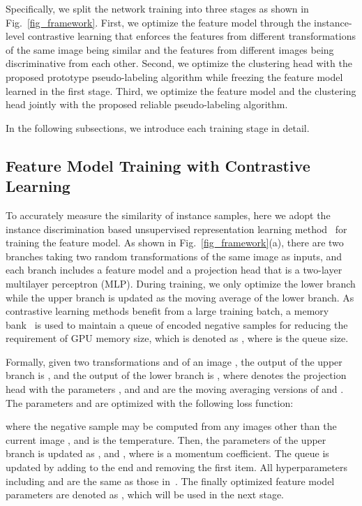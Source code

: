 \documentclass[journal]{IEEEtran}
\begin{document}
Specifically, we split the network training into three stages as shown in Fig.~\ref{fig_framework}.
First, we optimize the feature model  through the instance-level contrastive learning that enforces the features from different transformations of the same image being similar and the features from different images being discriminative from each other. 
Second, we optimize the clustering head  with the proposed prototype pseudo-labeling algorithm while freezing the feature model learned in the first stage.
Third, we optimize the feature model and the clustering head jointly with the proposed reliable pseudo-labeling algorithm.


In the following subsections, we introduce each training stage in detail.



\subsection{Feature Model Training with Contrastive Learning}\label{sec_fea}
To accurately measure the similarity of instance samples, here we adopt the instance discrimination based unsupervised representation learning method~\cite{He_2020_CVPR} for training the feature model.
As shown in Fig.~\ref{fig_framework}(a), there are two branches taking two random transformations of the same image as inputs, and each branch includes a feature model and a projection head that is a two-layer multilayer perceptron (MLP).
During training, we only optimize  the lower branch while the upper branch is updated as the moving average of the lower branch.
As contrastive learning methods benefit from a large training batch, a memory bank~\cite{wu2018unsupervised} is used to maintain a queue of encoded negative samples for reducing the requirement of GPU memory size, which is denoted as , where  is the queue size. 

Formally, given two transformations  and  of an image , the output of the upper branch is , and the output of the lower branch is , where  denotes the projection head with the parameters , and  and  are the moving averaging versions of  and .
The parameters  and   are optimized with the following loss function:

where the negative sample  may be computed from any images other than the current image , and  is the temperature. Then, the parameters of the upper branch is updated as  , and , where  is a momentum coefficient.
The queue is updated by adding  to the end and removing the first item. All hyperparameters including  and  are the same as those in~\cite{He_2020_CVPR}.
The finally optimized feature model parameters are denoted as , which will be used in the next stage.
\end{document}
